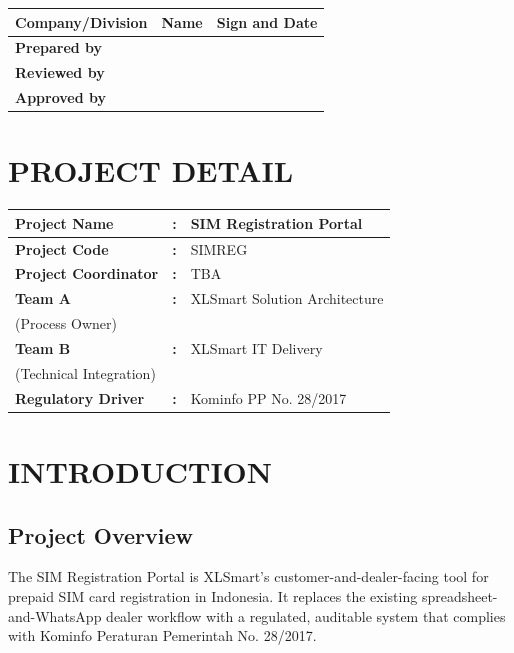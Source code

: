 \documentclass[12pt,a4paper]{article}
\begin{document}
\vspace{0.5cm}

\begin{longtable}{|p{4cm}|p{5cm}|p{4cm}|}
\hline
\textbf{Company/Division} & \textbf{Name} & \textbf{Sign and Date} \\
\hline
\textbf{Prepared by} & & \\
\hline
\textbf{Reviewed by} & & \\
\hline
\textbf{Approved by} & & \\
\hline
\end{longtable}

\newpage

\section*{PROJECT DETAIL}

\begin{longtable}{|p{5cm}|c|p{7cm}|}
\hline
\textbf{Project Name} & \textbf{:} & SIM Registration Portal \\
\hline
\textbf{Project Code} & \textbf{:} & SIMREG \\
\hline
\textbf{Project Coordinator} & \textbf{:} & TBA \\
\hline
\hline
\textbf{Team A} & \textbf{:} & XLSmart Solution Architecture \\
(Process Owner) & & \\
\hline
\textbf{Team B} & \textbf{:} & XLSmart IT Delivery \\
(Technical Integration) & & \\
\hline
\textbf{Regulatory Driver} & \textbf{:} & Kominfo PP No. 28/2017 \\
\hline
\end{longtable}

\newpage

\tableofcontents

\newpage

\section{INTRODUCTION}

\subsection{Project Overview}
The SIM Registration Portal is XLSmart's customer-and-dealer-facing tool for prepaid SIM card registration in Indonesia. It replaces the existing spreadsheet-and-WhatsApp dealer workflow with a regulated, auditable system that complies with Kominfo Peraturan Pemerintah No. 28/2017.
\end{document}
